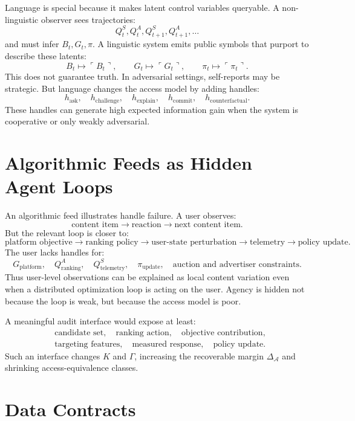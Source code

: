 \documentclass[11pt]{article}
\newcommand{\A}{\mathcal A}
\begin{document}
Language is special because it makes latent control variables queryable. A
non-linguistic observer sees trajectories:
\[
    Q^S_t,Q^A_t,Q^S_{t+1},Q^A_{t+1},\ldots
\]
and must infer $B_t,G_t,\pi$. A linguistic system emits public symbols that
purport to describe these latents:
\[
    B_t \mapsto \ulcorner B_t\urcorner,\qquad
    G_t \mapsto \ulcorner G_t\urcorner,\qquad
    \pi_t \mapsto \ulcorner \pi_t\urcorner .
\]
This does not guarantee truth. In adversarial settings, self-reports may be
strategic. But language changes the access model by adding handles:
\[
    h_{\mathrm{ask}},\quad
    h_{\mathrm{challenge}},\quad
    h_{\mathrm{explain}},\quad
    h_{\mathrm{commit}},\quad
    h_{\mathrm{counterfactual}}.
\]
These handles can generate high expected information gain when the system is
cooperative or only weakly adversarial.

\section{Algorithmic Feeds as Hidden Agent Loops}

An algorithmic feed illustrates handle failure. A user observes:
\[
    \text{content item}\to \text{reaction}\to \text{next content item}.
\]
But the relevant loop is closer to:
\[
    \text{platform objective}
    \to
    \text{ranking policy}
    \to
    \text{user-state perturbation}
    \to
    \text{telemetry}
    \to
    \text{policy update}.
\]
The user lacks handles for:
\[
    G_{\mathrm{platform}},
    \quad
    Q^A_{\mathrm{ranking}},
    \quad
    Q^S_{\mathrm{telemetry}},
    \quad
    \pi_{\mathrm{update}},
    \quad
    \text{auction and advertiser constraints}.
\]
Thus user-level observations can be explained as local content variation even
when a distributed optimization loop is acting on the user. Agency is hidden not
because the loop is weak, but because the access model is poor.

A meaningful audit interface would expose at least:
\begin{align*}
    &\text{candidate set},\quad
    \text{ranking action},\quad
    \text{objective contribution}, \\
    &\text{targeting features},\quad
    \text{measured response},\quad
    \text{policy update}.
\end{align*}
Such an interface changes $K$ and $\Gamma$, increasing the recoverable margin
$\Delta_\A$ and shrinking access-equivalence classes.

\section{Data Contracts}
\end{document}
